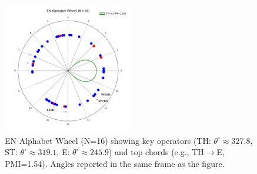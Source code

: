 \documentclass[10pt]{article}
\begin{document}
\begin{figure}[h]
    \centering
    \includegraphics[width=0.5\textwidth]{en_wheel.png}
    \caption{EN Alphabet Wheel (N=16) showing key operators (TH: $\theta^\circ \approx 327.8$, ST: $\theta^\circ \approx 319.1$, E: $\theta^\circ \approx 245.9$) and top chords (e.g., TH$\to$E, PMI=1.54). Angles reported in the same frame as the figure.}
    \label{fig:en_wheel}
\end{figure}
\end{document}
